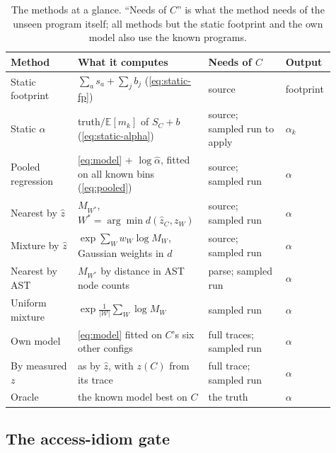 \documentclass[11pt]{article}
\newcommand{\E}{\mathbb{E}}
\begin{document}
\begin{table}[!htbp]
\centering\small
\caption[The methods at a glance]{The methods at a glance. ``Needs of $C$'' is what the method needs of the unseen
program itself; all methods but the static footprint and the own model also use the known programs.}
\label{tab:methods}
\begin{tabular}{>{\raggedright\arraybackslash}p{0.2\linewidth}>{\raggedright\arraybackslash}p{0.37\linewidth}>{\raggedright\arraybackslash}p{0.23\linewidth}>{\raggedright\arraybackslash}p{0.11\linewidth}}
\toprule
Method & What it computes & Needs of $C$ & Output \\
\midrule
Static footprint & $\sum_a s_a + \sum_j b_j$ (\ref{eq:static-fp}) & source & footprint \\
Static $\alpha$ & truth$/\E[m_k]$ of $S_C + b$ (\ref{eq:static-alpha}) & source; sampled run to apply & $\alpha_k$ \\
Pooled regression & \eqref{eq:model} + $\log\hat\alpha$, fitted on all known bins (\ref{eq:pooled}) & source; sampled run & $\alpha$ \\
Nearest by $\hat z$ & $M_{W^*}$, $W^* = \arg\min d(\hat z_C, z_W)$ & source; sampled run & $\alpha$ \\
Mixture by $\hat z$ & $\exp \sum_W w_W \log M_W$, Gaussian weights in $d$ & source; sampled run & $\alpha$ \\
Nearest by AST & $M_{W^*}$ by distance in AST node counts & parse; sampled run & $\alpha$ \\
Uniform mixture & $\exp \frac{1}{|\mathcal W|}\sum_W \log M_W$ & sampled run & $\alpha$ \\
\addlinespace
Own model & \eqref{eq:model} fitted on $C$'s six other configs & 6 full traces; sampled run & $\alpha$ \\
By measured $z$ & as by $\hat z$, with $z(C)$ from its trace & full trace; sampled run & $\alpha$ \\
Oracle & the known model best on $C$ & the truth & $\alpha$ \\
\bottomrule
\end{tabular}
\end{table}

\subsection{The access-idiom gate}
\label{sec:gate}
\end{document}
